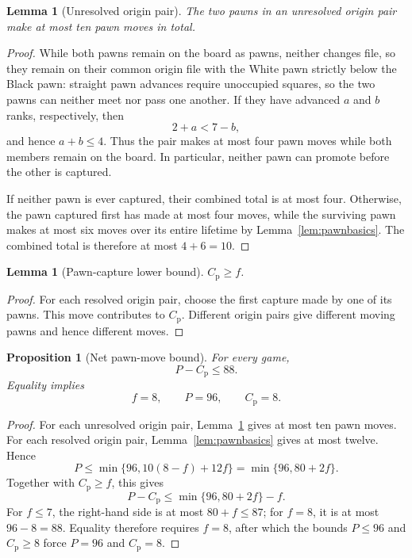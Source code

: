 \documentclass[11pt]{article}
\newtheorem{lemma}[theorem]{Lemma}
\newtheorem{proposition}[theorem]{Proposition}
\theoremstyle{definition}
\begin{document}
\begin{lemma}[Unresolved origin pair]\label{lem:cap10}
The two pawns in an unresolved origin pair make at most ten pawn moves in
total.
\end{lemma}

\begin{proof}
While both pawns remain on the board as pawns, neither changes file, so they
remain on their common origin file with the White pawn strictly below the
Black pawn: straight pawn advances require unoccupied squares, so the two
pawns can neither meet nor pass one another. If they have advanced $a$ and
$b$ ranks, respectively, then
\[
  2+a<7-b,
\]
and hence $a+b\le4$. Thus the pair makes at most four pawn moves while both
members remain on the board. In particular, neither pawn can promote before
the other is captured.

If neither pawn is ever captured, their combined total is at most four.
Otherwise, the pawn captured first has made at most four moves, while the
surviving pawn makes at most six moves over its entire lifetime by
Lemma~\ref{lem:pawnbasics}. The combined total is therefore at most
$4+6=10$.
\end{proof}

\begin{lemma}[Pawn-capture lower bound]\label{lem:pawncapturefloor}
$C_{\mathrm p}\ge f$.
\end{lemma}

\begin{proof}
For each resolved origin pair, choose the first capture made by one of its
pawns. This move contributes to $C_{\mathrm p}$. Different origin pairs give
different moving pawns and hence different moves.
\end{proof}

\begin{proposition}[Net pawn-move bound]\label{prop:pminusc}
For every game,
\[
  P-C_{\mathrm p}\le88.
\]
Equality implies
\[
  f=8,\qquad P=96,\qquad C_{\mathrm p}=8.
\]
\end{proposition}

\begin{proof}
For each unresolved origin pair, Lemma~\ref{lem:cap10} gives at most ten pawn
moves. For each resolved origin pair, Lemma~\ref{lem:pawnbasics} gives at
most twelve. Hence
\[
  P\le\min\bigl\{96,10(8-f)+12f\bigr\}
   =\min\{96,80+2f\}.
\]
Together with $C_{\mathrm p}\ge f$, this gives
\[
  P-C_{\mathrm p}\le\min\{96,80+2f\}-f.
\]
For $f\le7$, the right-hand side is at most $80+f\le87$; for $f=8$, it is at
most $96-8=88$. Equality therefore requires $f=8$, after which the bounds
$P\le96$ and $C_{\mathrm p}\ge8$ force $P=96$ and
$C_{\mathrm p}=8$.
\end{proof}
\end{document}
